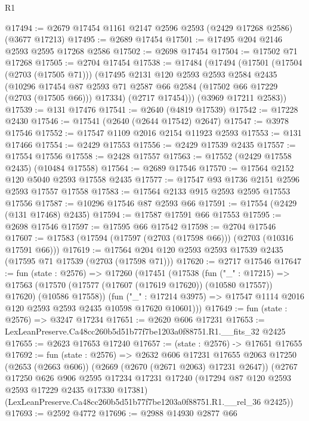 \begin{lexlean}{R1}
\begin{coremodule}
@17494 := @2679 @17454 @1161 @2147 @2596 @2593 (@2429 @17268 @2586) (@3677 @17213)
@17495 := @2689 @17454
@17501 := @17495 @204 @2146 @2593 @2595 @17268 @2586
@17502 := @2698 @17454
@17504 := @17502 @71 @17268
@17505 := @2704 @17454
@17538 := @17484
    (@17494
      (@17501
        (@17504 (@2703 (@17505 @71)))
        (@17495
          @2131
          @120
          @2593
          @2593
          @2584
          @2435
          (@10296
            @17454
            @87
            @2593
            @71
            @2587
            @66
            @2584
            (@17502 @66 @17229 (@2703 (@17505 @66)))
            @17334)
          (@2717 @17454)))
      (@3969 @17211 @2583))
@17539 := @131 @17476
@17541 := @2640 (@4819 @17539)
@17542 := @17228 @2430
@17546 := @17541 (@2640 (@2644 @17542) @2647)
@17547 := @3978 @17546
@17552 := @17547 @1109 @2016 @2154 @11923 @2593
@17553 := @131 @17466
@17554 := @2429 @17553
@17556 := @2429 @17539 @2435
@17557 := @17554 @17556
@17558 := @2428 @17557
@17563 := @17552 (@2429 @17558 @2435) (@10484 @17558)
@17564 := @2689 @17546
@17570 := @17564 @2152 @120 @5040 @2593 @17558 @2435
@17577 := @17547 @93 @1736 @2151 @2596 @2593 @17557 @17558
@17583 := @17564 @2133 @915 @2593 @2595 @17553 @17556
@17587 := @10296 @17546 @87 @2593 @66
@17591 := @17554 (@2429 (@131 @17468) @2435)
@17594 := @17587 @17591 @66 @17553
@17595 := @2698 @17546
@17597 := @17595 @66 @17542
@17598 := @2704 @17546
@17607 := @17583 (@17594 (@17597 (@2703 (@17598 @66))) (@2703 (@10316 @17591 @66)))
@17619 := @17564 @204 @120 @2593 @2593 @17539 @2435 (@17595 @71 @17539 (@2703 (@17598 @71)))
@17620 := @2717 @17546
@17647 := fun (state : @2576) =>
  @17260
    (@17451
      (@17538
        (fun ("_" : @17215) =>
        @17563 (@17570 (@17577 (@17607 (@17619 @17620)) (@10580 @17557)) @17620) (@10586 @17558))
        (fun ("_" : @17214 @3975) =>
        @17547 @1114 @2016 @120 @2593 @2593 @2435 @10598 @17620 @10601)))
@17649 := fun (state : @2576) => @3247 @17234
@17651 := @2620 @606 @17231
@17653 := LexLeanPreserve.Ca48cc260b5d51b77f7be1203a0f88751.R1.__fits_32 @2425
@17655 := @2623 @17653 @17240
@17657 := (state : @2576) -> @17651 @17655
@17692 := fun (state : @2576) =>
  @2632
    @606
    @17231
    @17655
    @2063
    @17250
    (@2653 (@2663 @606))
    (@2669 (@2670 (@2671 @2063) @17231 @2647))
    (@2767
      @17250
      @626
      @906
      @2595
      @17234
      @17231
      @17240
      (@17294 @87 @120 @2593 @2593 @17229 @2435 @17330 @17381)
      (LexLeanPreserve.Ca48cc260b5d51b77f7be1203a0f88751.R1.__rel_36 @2425))
@17693 := @2592 @4772
@17696 := @2988 @14930 @2877 @66

\end{coremodule}
\end{lexlean}
